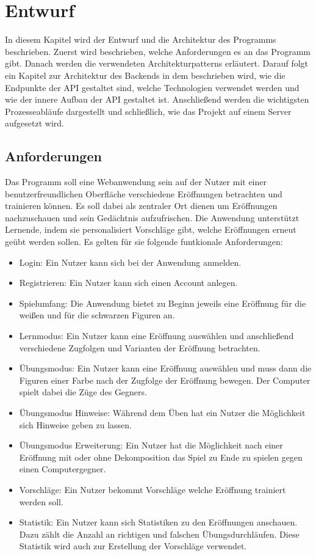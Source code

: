 
\chapter{Entwurf} %
In diesem Kapitel wird der Entwurf und die Architektur des Programms beschrieben. Zuerst wird beschrieben, welche Anforderungen es an das Programm gibt. Danach werden die verwendeten Architekturpatterns erläutert. Darauf folgt ein Kapitel zur Architektur des Backends in dem beschrieben wird, wie die Endpunkte der API gestaltet sind, welche Technologien verwendet werden und wie der innere Aufbau der API gestaltet ist. Anschließend werden die wichtigsten Prozesseabläufe dargestellt und schließlich, wie das Projekt auf einem Server aufgesetzt wird.

\section{Anforderungen}
Das Programm soll eine Webanwendung sein auf der Nutzer mit einer benutzerfreundlichen Oberfläche verschiedene Eröffnungen betrachten und trainieren können. Es soll dabei als zentraler Ort dienen um Eröffnungen nachzuschauen und sein Gedächtnis aufzufrischen. Die Anwendung unterstützt Lernende, indem sie personalisiert Vorschläge gibt, welche Eröffnungen erneut geübt werden sollen. Es gelten für sie folgende funtkionale Anforderungen:

\begin{itemize}
    \item Login: Ein Nutzer kann sich bei der Anwendung anmelden.
    \item Registrieren: Ein Nutzer kann sich einen Account anlegen.
    \item Spielumfang: Die Anwendung bietet zu Beginn jeweils eine Eröffnung für die weißen und für die schwarzen Figuren an.
    \item Lernmodus: Ein Nutzer kann eine Eröffnung auswählen und anschließend verschiedene Zugfolgen und Varianten der Eröffnung betrachten.
    \item Übungsmodus: Ein Nutzer kann eine Eröffnung auswählen und muss dann die Figuren einer Farbe nach der Zugfolge der Eröffnung bewegen. Der Computer spielt dabei die Züge des Gegners.
    \item Übungsmodus Hinweise: Während dem Üben hat ein Nutzer die Möglichkeit sich Hinweise geben zu lassen.
    \item Übungsmodus Erweiterung: Ein Nutzer hat die Möglichkeit nach einer Eröffnung mit oder ohne Dekomposition das Spiel zu Ende zu spielen gegen einen Computergegner.
    \item Vorschläge: Ein Nutzer bekommt Vorschläge welche Eröffnung trainiert werden soll.
    \item Statistik: Ein Nutzer kann sich Statistiken zu den Eröffnungen anschauen. Dazu zählt die Anzahl an richtigen und falschen Übungsdurchläufen. Diese Statistik wird auch zur Erstellung der Vorschläge verwendet.
\end{itemize}

